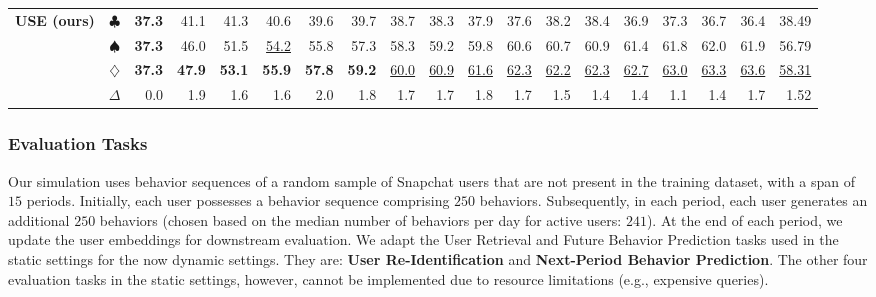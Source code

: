 \documentclass{article}
\begin{document}
\begin{table}[t]
{\begin{tabular}{lcrrrrrrrrrrrrrrrrr}
            \cmidrule(lr){1-19}

             \multirow{4}{*}{\textbf{USE (ours)}} & $\clubsuit$ & \textbf{37.3} & 41.1 & 41.3 & 40.6 & 39.6 & 39.7 & 38.7 & 38.3 & 37.9 & 37.6 & 38.2 & 38.4 & 36.9 & 37.3 & 36.7 & 36.4 & 38.49\\
             & $\spadesuit$ & \textbf{37.3} & 46.0 & 51.5 & \underline{54.2} & 55.8 & 57.3 & 58.3 & 59.2 & 59.8 & 60.6 & 60.7 & 60.9 & 61.4 & 61.8 & 62.0 & 61.9 & 56.79\\
             & $\diamondsuit$ & \textbf{37.3} & \textbf{47.9} & \textbf{53.1} & \textbf{55.9} & \textbf{57.8} & \textbf{59.2} & \underline{60.0} & \underline{60.9} & \underline{61.6} & \underline{62.3} & \underline{62.2} & \underline{62.3} & \underline{62.7} & \underline{63.0} & \underline{63.3} & \underline{63.6} & \underline{58.31}\\
             & $\Delta$ & 0.0 & 1.9 & 1.6 & 1.6 & 2.0 & 1.8 & 1.7 & 1.7 & 1.8 & 1.7 & 1.5 & 1.4 & 1.4 & 1.1 & 1.4 & 1.7 & 1.52\\

            
		\bottomrule
	\end{tabular}}
\end{table}


\subsubsection{Evaluation Tasks}
Our simulation uses behavior sequences of
a random sample of Snapchat users that are not present in the training dataset, with a span of $15$ periods. Initially, each user possesses a behavior sequence comprising $250$ behaviors. Subsequently, in each period, each user generates an additional $250$ behaviors (chosen based on the median number of behaviors per day for active users: $241$). At the end of each period, we update the user embeddings for downstream evaluation. We adapt the User Retrieval and Future Behavior Prediction tasks used in the static settings for the now dynamic settings. They are: \textbf{User Re-Identification} and \textbf{Next-Period Behavior Prediction}. The other four evaluation tasks in the static settings, however, cannot be implemented due to resource limitations (e.g., expensive queries). 

\end{document}
